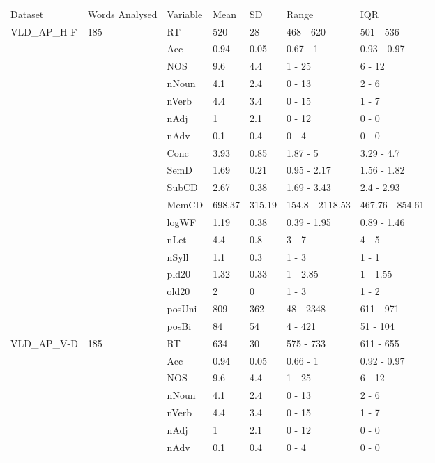 \begin{table}[ht]
\centering
\begingroup\normalsize
\begin{tabular}{lllllll}
  \hline
  \hline
Dataset & Words Analysed & Variable & Mean & SD & Range & IQR \\ 
  VLD\_AP\_H-F & 185 & RT & 520 & 28 & 468 - 620 & 501 - 536 \\ 
   &  & Acc & 0.94 & 0.05 & 0.67 - 1 & 0.93 - 0.97 \\ 
   &  & NOS & 9.6 & 4.4 & 1 - 25 & 6 - 12 \\ 
   &  & nNoun & 4.1 & 2.4 & 0 - 13 & 2 - 6 \\ 
   &  & nVerb & 4.4 & 3.4 & 0 - 15 & 1 - 7 \\ 
   &  & nAdj & 1 & 2.1 & 0 - 12 & 0 - 0 \\ 
   &  & nAdv & 0.1 & 0.4 & 0 - 4 & 0 - 0 \\ 
   &  & Conc & 3.93 & 0.85 & 1.87 - 5 & 3.29 - 4.7 \\ 
   &  & SemD & 1.69 & 0.21 & 0.95 - 2.17 & 1.56 - 1.82 \\ 
   &  & SubCD & 2.67 & 0.38 & 1.69 - 3.43 & 2.4 - 2.93 \\ 
   &  & MemCD & 698.37 & 315.19 & 154.8 - 2118.53 & 467.76 - 854.61 \\ 
   &  & logWF & 1.19 & 0.38 & 0.39 - 1.95 & 0.89 - 1.46 \\ 
   &  & nLet & 4.4 & 0.8 & 3 - 7 & 4 - 5 \\ 
   &  & nSyll & 1.1 & 0.3 & 1 - 3 & 1 - 1 \\ 
   &  & pld20 & 1.32 & 0.33 & 1 - 2.85 & 1 - 1.55 \\ 
   &  & old20 & 2 & 0 & 1 - 3 & 1 - 2 \\ 
   &  & posUni & 809 & 362 & 48 - 2348 & 611 - 971 \\ 
   &  & posBi & 84 & 54 & 4 - 421 & 51 - 104 \\ 
  VLD\_AP\_V-D & 185 & RT & 634 & 30 & 575 - 733 & 611 - 655 \\ 
   &  & Acc & 0.94 & 0.05 & 0.66 - 1 & 0.92 - 0.97 \\ 
   &  & NOS & 9.6 & 4.4 & 1 - 25 & 6 - 12 \\ 
   &  & nNoun & 4.1 & 2.4 & 0 - 13 & 2 - 6 \\ 
   &  & nVerb & 4.4 & 3.4 & 0 - 15 & 1 - 7 \\ 
   &  & nAdj & 1 & 2.1 & 0 - 12 & 0 - 0 \\ 
   &  & nAdv & 0.1 & 0.4 & 0 - 4 & 0 - 0 \\ 

\end{tabular}
\end{table}
